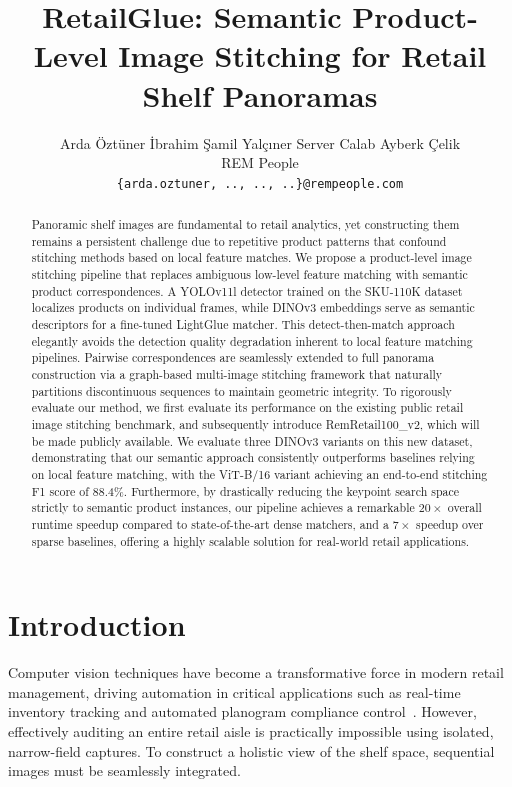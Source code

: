 \documentclass[10pt,twocolumn,letterpaper]{article}
\title{RetailGlue: Semantic Product-Level Image Stitching for Retail Shelf Panoramas}
\author{Arda Öztüner \quad İbrahim Şamil Yalçıner \quad Server Calab \quad Ayberk Çelik\\
REM People\\
{\tt\small \{arda.oztuner, .., .., ..\}@rempeople.com}
}
\begin{document}
\maketitle
\begin{abstract}
Panoramic shelf images are fundamental to retail analytics, yet constructing them remains a persistent challenge due to repetitive product patterns that confound stitching methods based on local feature matches. We propose a product-level image stitching pipeline that replaces ambiguous low-level feature matching with semantic product correspondences. A YOLOv11l detector trained on the SKU-110K dataset localizes products on individual frames, while DINOv3 embeddings serve as semantic descriptors for a fine-tuned LightGlue matcher. This detect-then-match approach elegantly avoids the detection quality degradation inherent to local feature matching pipelines. Pairwise correspondences are seamlessly extended to full panorama construction via a graph-based multi-image stitching framework that naturally partitions discontinuous sequences to maintain geometric integrity. To rigorously evaluate our method, we first evaluate its performance on the existing public retail image stitching benchmark, and subsequently introduce RemRetail100\_v2, which will be made publicly available. We evaluate three DINOv3 variants on this new dataset, demonstrating that our semantic approach consistently outperforms baselines relying on local feature matching, with the ViT-B/16 variant achieving an end-to-end stitching F1 score of 88.4\%. Furthermore, by drastically reducing the keypoint search space strictly to semantic product instances, our pipeline achieves a remarkable $20\times$ overall runtime speedup compared to state-of-the-art dense matchers, and a $7\times$ speedup over sparse baselines, offering a highly scalable solution for real-world retail applications.
\end{abstract}


\section{Introduction}

Computer vision techniques have become a transformative force in modern retail management, driving automation in critical applications such as real-time inventory tracking and automated planogram compliance control~\cite{planogram_monitoring,article,Ou2025}. However, effectively auditing an entire retail aisle is practically impossible using isolated, narrow-field captures. To construct a holistic view of the shelf space, sequential images must be seamlessly integrated. 
\end{document}
